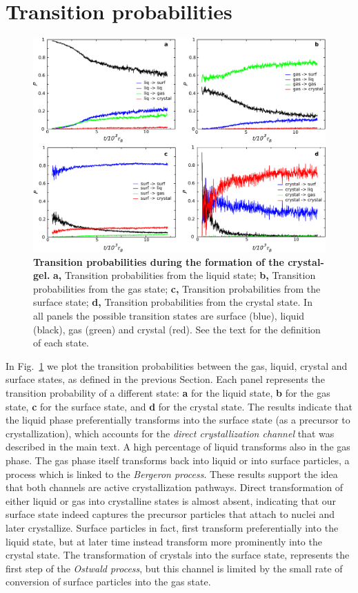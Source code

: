 \section*{Transition probabilities}
\begin{figure}
 \centering
 \includegraphics[width=14cm]{./sfig1.pdf}
 \caption{{\bf Transition probabilities during the formation of the crystal-gel.}
 {\bf a,} Transition probabilities from the liquid state;
 {\bf b,} Transition probabilities from the gas state;
 {\bf c,} Transition probabilities from the surface state;
 {\bf d,} Transition probabilities from the crystal state. In all panels the possible
 transition states are surface (blue), liquid (black), gas (green) and crystal (red).
 See the text for the definition of each state.
 }
 \label{fig:probabilities}
\end{figure}

In Fig.~\ref{fig:probabilities} we plot the transition probabilities between the gas, liquid, crystal
and surface states, as defined in the previous Section. Each panel represents the transition probability
of a different state: {\bf a} for the liquid state, {\bf b} for the gas state, {\bf c} for the surface state,
and {\bf d} for the crystal state. The results indicate that the liquid phase preferentially transforms into
the surface state (as a precursor to crystallization), which accounts for the \emph{direct crystallization channel}
that was described in the main text. A high percentage of liquid transforms also in the gas phase. The gas phase itself
transforms back into liquid or into surface particles, a process which
is linked to the \emph{Bergeron process}. These results support the idea that both channels are active
crystallization pathways. Direct transformation of either liquid or gas into crystalline states is almost absent,
indicating that our surface state indeed captures the precursor particles that attach to nuclei and later crystallize.
Surface particles in fact, first transform preferentially into the liquid state, but at later time instead transform
more prominently into the crystal state. The transformation of crystals into the surface state, represents the first
step of the \emph{Ostwald process}, but this channel is limited by the small rate of conversion of surface particles
into the gas state.

